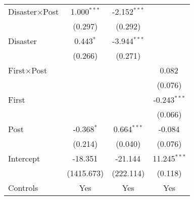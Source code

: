 \begin{tabular}{@{\extracolsep{5pt}}lccc}
    Disaster$\times$Post       & 1.000$^{***}$                                                        & -2.152$^{***}$ &                  \\
                        & (0.297)                                                              & (0.292)        &                  \\
    Disaster            & 0.443$^{*}$                                                          & -3.944$^{***}$ &                  \\
                        & (0.266)                                                              & (0.271)        &                  \\
    First$\times$Post          &                                                                      &                & 0.082$^{}$       \\
                        &                                                                      &                & (0.076)          \\
    First               &                                                                      &                & -0.243$^{***}$   \\
                        &                                                                      &                & (0.066)          \\
    Post                & -0.368$^{*}$                                                         & 0.664$^{***}$  & -0.084$^{}$      \\
                        & (0.214)                                                              & (0.040)        & (0.076)          \\
    Intercept           & -18.351$^{}$                                                         & -21.144$^{}$   & 11.245$^{***}$   \\
                        & (1415.673)                                                           & (222.114)      & (0.118)          \\
    Controls            & Yes                                                                  & Yes            & Yes              \\

\end{tabular}
